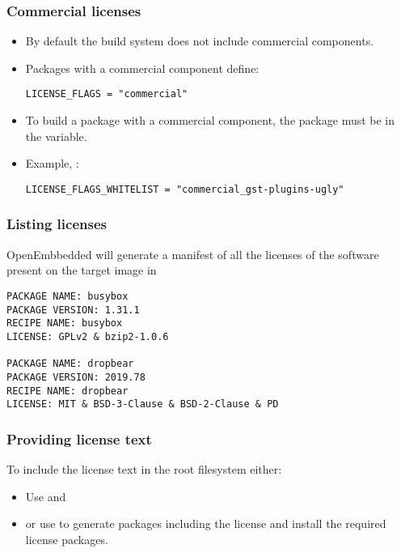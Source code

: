 \begin{frame}[fragile]
  \frametitle{Commercial licenses}
  \begin{itemize}
    \item By default the build system does not include commercial
      components.
    \item Packages with a commercial component define:
      \begin{block}{}
      \begin{verbatim}
LICENSE_FLAGS = "commercial"
      \end{verbatim}
      \end{block}
    \item To build a package with a commercial component, the package
      must be in the  variable.
    \item Example, :
      \begin{block}{}
      \begin{verbatim}
LICENSE_FLAGS_WHITELIST = "commercial_gst-plugins-ugly"
      \end{verbatim}
      \end{block}
  \end{itemize}
\end{frame}

\begin{frame}[fragile]
  \frametitle{Listing licenses}
  OpenEmbbedded will generate a manifest of all the licenses of the
  software present on the target image in
  \begin{block}{}
    \fontsize{9}{9}\selectfont
    \begin{verbatim}
PACKAGE NAME: busybox
PACKAGE VERSION: 1.31.1
RECIPE NAME: busybox
LICENSE: GPLv2 & bzip2-1.0.6

PACKAGE NAME: dropbear
PACKAGE VERSION: 2019.78
RECIPE NAME: dropbear
LICENSE: MIT & BSD-3-Clause & BSD-2-Clause & PD
    \end{verbatim}
  \end{block}
\end{frame}

\begin{frame}[fragile]
  \frametitle{Providing license text}
  To include the license text in the root filesystem either:
  \begin{itemize}
  \item Use  and 
  \item or use  to generate
    packages including the license and install the required license
    packages.
  \end{itemize}
\end{frame}

